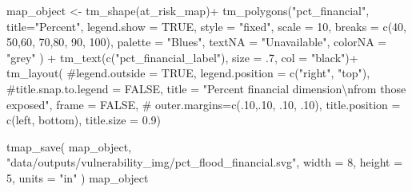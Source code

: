 \documentclass[
  letterpaper,
  DIV=11,
  numbers=noendperiod]{scrartcl}
\newenvironment{Shaded}{}{}
\newcommand{\AttributeTok}[1]{\textcolor[rgb]{0.84,0.23,0.29}{#1}}
\newcommand{\CommentTok}[1]{\textcolor[rgb]{0.42,0.45,0.49}{#1}}
\newcommand{\ConstantTok}[1]{\textcolor[rgb]{0.00,0.36,0.77}{#1}}
\newcommand{\DecValTok}[1]{\textcolor[rgb]{0.00,0.36,0.77}{#1}}
\newcommand{\FloatTok}[1]{\textcolor[rgb]{0.00,0.36,0.77}{#1}}
\newcommand{\FunctionTok}[1]{\textcolor[rgb]{0.44,0.26,0.76}{#1}}
\newcommand{\NormalTok}[1]{\textcolor[rgb]{0.14,0.16,0.18}{#1}}
\newcommand{\OtherTok}[1]{\textcolor[rgb]{0.44,0.26,0.76}{#1}}
\newcommand{\SpecialCharTok}[1]{\textcolor[rgb]{0.00,0.36,0.77}{#1}}
\newcommand{\StringTok}[1]{\textcolor[rgb]{0.01,0.18,0.38}{#1}}
\begin{document}
\begin{Shaded}
\begin{Highlighting}[]
\NormalTok{map\_object }\OtherTok{\textless{}{-}}
\FunctionTok{tm\_shape}\NormalTok{(at\_risk\_map)}\SpecialCharTok{+}
  \FunctionTok{tm\_polygons}\NormalTok{(}\StringTok{"pct\_financial"}\NormalTok{,}
              \AttributeTok{title=}\StringTok{"Percent"}\NormalTok{, }
              \AttributeTok{legend.show =} \ConstantTok{TRUE}\NormalTok{,}
              \AttributeTok{style =} \StringTok{"fixed"}\NormalTok{,}
              \AttributeTok{scale =} \DecValTok{10}\NormalTok{,}
              \AttributeTok{breaks =} \FunctionTok{c}\NormalTok{(}\DecValTok{40}\NormalTok{, }\DecValTok{50}\NormalTok{,}\DecValTok{60}\NormalTok{, }\DecValTok{70}\NormalTok{,}\DecValTok{80}\NormalTok{, }\DecValTok{90}\NormalTok{, }\DecValTok{100}\NormalTok{),}
              \AttributeTok{palette =} \StringTok{"Blues"}\NormalTok{,}
              \AttributeTok{textNA =} \StringTok{"Unavailable"}\NormalTok{,}
              \AttributeTok{colorNA =} \StringTok{"grey"}
\NormalTok{              ) }\SpecialCharTok{+}
  \FunctionTok{tm\_text}\NormalTok{(}\FunctionTok{c}\NormalTok{(}\StringTok{"pct\_financial\_label"}\NormalTok{), }\AttributeTok{size =}\NormalTok{ .}\DecValTok{7}\NormalTok{, }\AttributeTok{col =} \StringTok{"black"}\NormalTok{)}\SpecialCharTok{+}
  \FunctionTok{tm\_layout}\NormalTok{(}
    \CommentTok{\#legend.outside = TRUE,}
    \AttributeTok{legend.position =} \FunctionTok{c}\NormalTok{(}\StringTok{"right"}\NormalTok{, }\StringTok{"top"}\NormalTok{),}
    \CommentTok{\#title.snap.to.legend = FALSE,}
    \AttributeTok{title =} 
      \StringTok{"Percent financial dimension}\SpecialCharTok{\textbackslash{}n}\StringTok{from those exposed"}\NormalTok{,}
    \AttributeTok{frame =} \ConstantTok{FALSE}\NormalTok{,}
\CommentTok{\#            outer.margins=c(.10,.10, .10, .10), }
            \AttributeTok{title.position =} \FunctionTok{c}\NormalTok{(}\StringTok{\textquotesingle{}left\textquotesingle{}}\NormalTok{, }\StringTok{\textquotesingle{}bottom\textquotesingle{}}\NormalTok{),}
            \AttributeTok{title.size =} \FloatTok{0.9}\NormalTok{)}

\FunctionTok{tmap\_save}\NormalTok{(}
\NormalTok{  map\_object,}
  \StringTok{"data/outputs/vulnerability\_img/pct\_flood\_financial.svg"}\NormalTok{,}
  \AttributeTok{width =} \DecValTok{8}\NormalTok{,}
  \AttributeTok{height =} \DecValTok{5}\NormalTok{,}
  \AttributeTok{units =} \StringTok{"in"}
\NormalTok{)}
\NormalTok{map\_object}
\end{Highlighting}
\end{Shaded}
\end{document}
